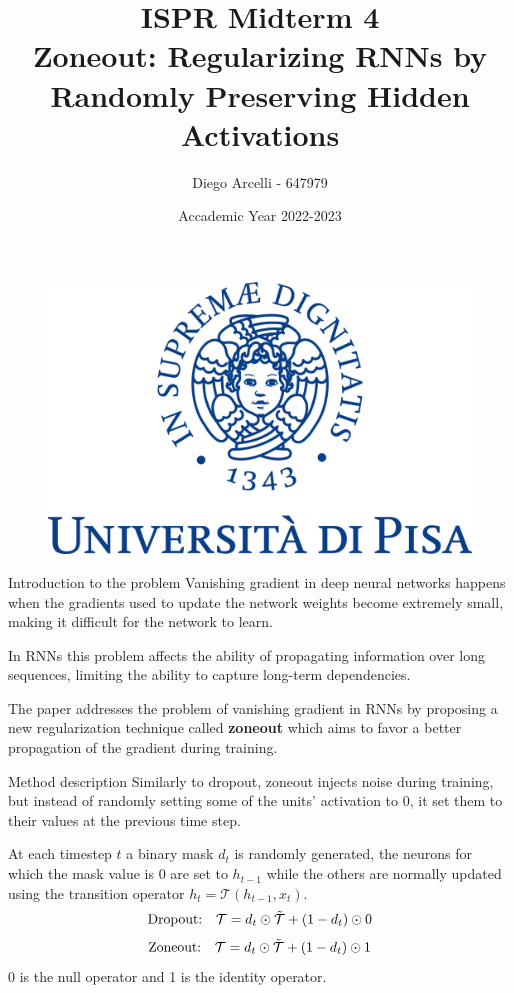 \documentclass{beamer}
\author[Diego Arcelli]{ Diego Arcelli - 647979}
\title[ISPR Midterm 4]{ISPR Midterm 4 \\ Zoneout: Regularizing RNNs by Randomly Preserving Hidden Activations}
\institute [University of Pisa] {University of Pisa}
\date{\scriptsize Accademic Year 2022-2023}
\begin{document}
	
\begin{frame}
    \titlepage
    \begin{figure}[htpb]
        \begin{center}
            \includegraphics[width=0.25\linewidth]{images/unipi-logo.png}
        \end{center}
    \end{figure}
\end{frame}


\begin{frame}{Introduction to the problem}
Vanishing gradient in deep neural networks happens when the gradients used to update the network weights become extremely small, making it difficult for the network to learn.

\vspace{0.3cm}
In RNNs this problem affects the ability of propagating information over long sequences, limiting the ability to capture long-term dependencies.

\vspace{0.3cm}
The paper addresses the problem of vanishing gradient in RNNs by proposing a new regularization technique called \textbf{zoneout} which aims to favor a better propagation of the gradient during training.

\end{frame}


\begin{frame}{Method description}
Similarly to dropout, zoneout injects noise during training, but instead of randomly setting some of the units' activation to 0, it set them to their values at the previous time step. 

\vspace{0.3cm}
At each timestep $t$ a binary mask $d_t$ is randomly generated, the neurons for which the mask value is 0 are set to $h_{t-1}$ while the others are normally updated using the transition operator $h_t = \mathcal{T}(h_{t-1}, x_t)$.
\vspace{0.3cm}
\[\text{Dropout:} \quad \mathcal{T} = d_t \odot \Tilde{\mathcal{T}} + (1-d_t) \odot 0\]
\[ \text{Zoneout:} \quad \mathcal{T} = d_t \odot \Tilde{\mathcal{T}} + (1-d_t) \odot 1 \]
0 is the null operator and 1 is the identity operator.
\end{frame}
\end{document}
